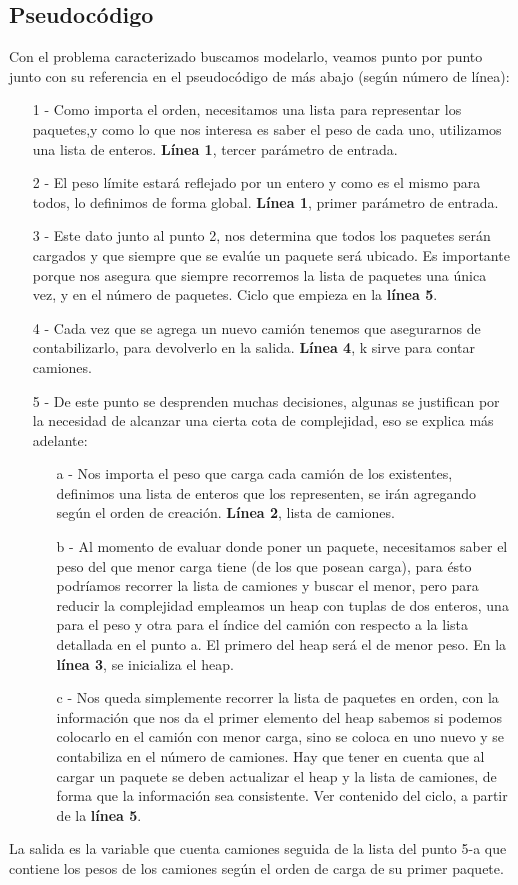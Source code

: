 \subsection{Pseudoc\'odigo}

Con el problema caracterizado buscamos modelarlo, veamos punto por punto junto con su referencia en el pseudocódigo de más abajo (según número de línea):
\begin{itemize}
\item[1]- Como importa el orden, necesitamos una lista para representar los paquetes,y como lo que nos interesa es saber el peso de cada uno, utilizamos una lista de enteros. \textbf{Línea 1}, tercer parámetro de entrada.
\item[2]- El peso límite estará reflejado por un entero y como es el mismo para todos, lo definimos de forma global.\textbf{ Línea 1}, primer parámetro de entrada.
\item[3]- Este dato junto al punto 2, nos determina que todos los paquetes serán cargados y que siempre que se evalúe un paquete será ubicado. Es importante porque nos asegura que siempre recorremos la lista de paquetes una única vez, y en el número de paquetes. Ciclo que empieza en la \textbf{línea 5}.
\item[4]- Cada vez que se agrega un nuevo camión tenemos que asegurarnos de contabilizarlo, para devolverlo en la salida. \textbf{Línea 4}, k sirve para contar camiones.

\item[5]- De este punto se desprenden muchas decisiones, algunas se justifican por la necesidad de alcanzar una cierta cota de complejidad, eso se explica más adelante:
	\begin{enumerate}
	\item[a] - Nos importa el peso que carga cada camión de los existentes, definimos una lista de enteros que los representen, se irán agregando según el orden de creación. \textbf{Línea 2}, lista de camiones.
	\item[b] - Al momento de evaluar donde poner un paquete, necesitamos saber el peso del que menor carga tiene (de los que posean carga), para ésto podríamos recorrer la lista de camiones y buscar el menor, pero para reducir la complejidad empleamos un heap con tuplas de dos enteros, una para el peso y otra para el índice del camión con respecto a la lista detallada en el punto a. El primero del heap será el de menor peso. En la \textbf{línea 3}, se inicializa el heap.
	
	\item[c] - Nos queda simplemente recorrer la lista de paquetes en orden, con la información que nos da el primer elemento del heap sabemos si podemos colocarlo en el camión con menor carga, sino se coloca en uno nuevo y se contabiliza en el número de camiones. Hay que tener en cuenta que al cargar un paquete se deben actualizar el heap y la lista de camiones, de forma que la información sea consistente. Ver contenido del ciclo, a partir de la \textbf{línea 5}.
	\end{enumerate}
\end{itemize}
La salida es la variable que cuenta camiones seguida de la lista del punto 5-a que contiene los pesos de los camiones según el orden de carga de su primer paquete.

